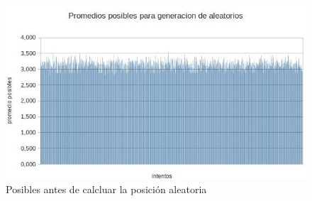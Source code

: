 \documentclass[a4paper,10pt]{article}
\begin{document}
\begin{itemize}
\begin{figure}[h]
 \centering
 \includegraphics[scale=0.5]{promediosposibles.jpg}
 \caption{Posibles antes de calcluar la posición aleatoria}
 \label{fig:posibles}
\end{figure}

\end{itemize}
\end{document}
